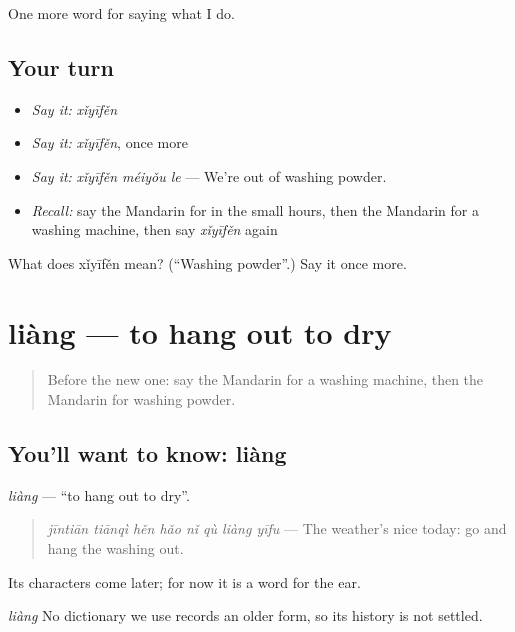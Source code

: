 \begin{grammarlens}[title={What you've built}]
One more word for saying what I do.
\end{grammarlens}

\subsection*{Your turn}
\begin{itemize}
\raggedright
  \item \emph{Say it:} \emph{xǐyīfěn}
  \item \emph{Say it:} \emph{xǐyīfěn}, once more
  \item \emph{Say it:} \emph{xǐyīfěn méiyǒu le} — We're out of washing powder.
  \item \emph{Recall:} say the Mandarin for in the small hours, then the Mandarin for a washing machine, then say \emph{xǐyīfěn} again
\end{itemize}

\begin{tcolorbox}[breakable,colback=teal!4,colframe=teal!35!black,title={Before you move on}]
What does xǐyīfěn mean? (\textquotedblleft{}Washing powder\textquotedblright{}.) Say it once more.
\end{tcolorbox}
\section[liàng]{liàng — to hang out to dry}

\label{lesson:ZH-C179-liang}



\begin{quote}
Before the new one: say the Mandarin for a washing machine, then the Mandarin for washing powder.
\end{quote}

\subsection*{You'll want to know: liàng}
\emph{liàng} — \textquotedblleft{}to hang out to dry\textquotedblright{}.

\begin{quote}
\emph{jīntiān tiānqì hěn hǎo nǐ qù liàng yīfu} — The weather's nice today: go and hang the washing out.
\end{quote}

Its characters come later; for now it is a word for the ear.

\begin{cousinweb}
\emph{liàng} No dictionary we use records an older form, so its history is not settled.
\end{cousinweb}

